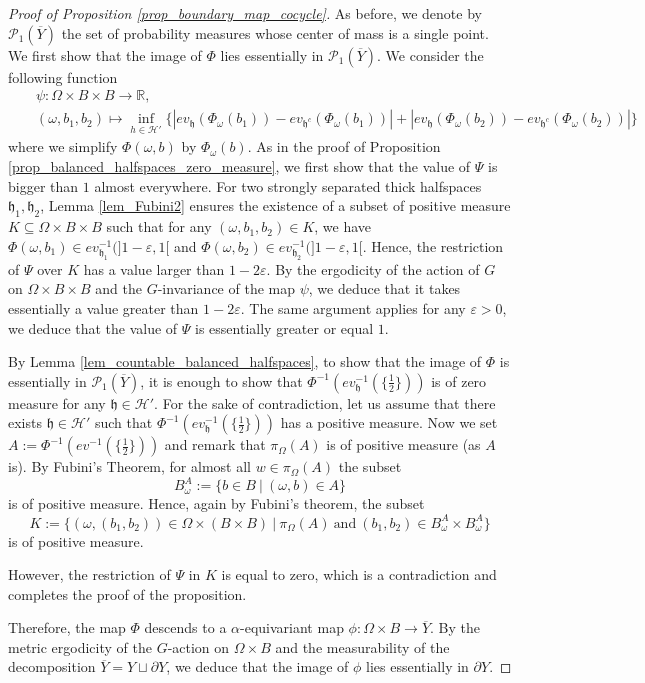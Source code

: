 \documentclass{amsart}
\numberwithin{equation}{section}
\newcommand{\HH}{\mathcal{H}}     %
\newcommand{\hh}{\mathfrak{h}}    %
\newcommand{\PP}{\mathcal{P}}     %
\newcommand{\RR}{\mathbb{R}}      %
\theoremstyle{definition}
\def\bar{\overline}
\begin{document}
\begin{proof}[Proof of Proposition \ref{prop_boundary_map_cocycle}]
    As before, we denote by $\PP_1(\bar{Y})$ the set of probability measures whose center of mass is a single point. We first show that the image of $\Phi$ lies essentially in $\PP_1(\bar Y)$.  We consider the following function 
    \begin{eqnarray*}
            &&\psi: \Omega\times B\times B \rightarrow \RR,\\
            &&(\omega,b_1,b_2) \mapsto \inf_{h\in\HH'}{\{|ev_\hh(\Phi_{\omega}(b_1))-ev_{\hh^c}(\Phi_{\omega}(b_1))|+|ev_\hh(\Phi_{\omega}(b_2))-ev_{\hh^c}(\Phi_{\omega}(b_2))|\}}
        \end{eqnarray*}
  where we simplify $\Phi(\omega,b)$ by $\Phi_{\omega}(b)$. As in the proof of Proposition \ref{prop_balanced_halfspaces_zero_measure}, we first show that the value of $\Psi$ is bigger than $1$ almost everywhere. For two strongly separated thick halfspaces $\hh_1,\hh_2$, Lemma \ref{lem_Fubini2} ensures the existence of a subset of positive measure $K\subseteq \Omega\times B\times B$ such that for any $(\omega,b_1,b_2)\in K$, we have $\Phi(\omega,b_1)\in ev_{\hh_1}^{-1}(]1-\varepsilon,1[$ and $\Phi(\omega,b_2)\in ev_{\hh_2}^{-1}(]1-\varepsilon,1[$. Hence, the restriction of $\Psi$ over $K$ has a value larger than $1-2\varepsilon$. By the ergodicity of the action of $G$ on $\Omega\times B\times B$ and the $G$-invariance of the map $\psi$, we deduce that it takes essentially a value greater than $1-2\varepsilon$. The same argument applies for any $\varepsilon>0$, we deduce that the value of $\Psi$ is essentially greater or equal $1$.\par 
  By Lemma \ref{lem_countable_balanced_halfspaces}, to show that the image of $\Phi$ is essentially in $\PP_1(\bar Y)$, it is enough to show that $\Phi^{-1}(ev_\hh^{-1}(\{\frac{1}{2}\})) $ is of zero measure for any $\hh\in\HH'$. For the sake of contradiction, let us assume that there exists $\hh\in\HH'$ such that $\Phi^{-1}(ev_\hh^{-1}(\{\frac{1}{2}\}))$ has a positive measure. Now we set $A:=\Phi^{-1}(ev^{-1}(\{\frac{1}{2}\}))$ and remark that $\pi_{\Omega}(A)$ is of positive measure (as $A$ is). By Fubini's Theorem, for almost all $w\in \pi_\Omega(A)$ the subset 
  \[
  B_\omega^A:=\{b\in B\ |\ (\omega,b)\in A\}
  \]
  is of positive measure. Hence, again by Fubini's theorem, the subset 
  \[
  K:=\{(\omega,(b_1,b_2))\in \Omega\times ( B\times B)\ |\ \pi_\Omega(A)\ \text{and} \ (b_1,b_2)\in B_\omega^A\times B_\omega^A  \}
  \]
  is of positive measure.\par 
  

  However, the restriction of $\Psi$ in $K$ is equal to zero, which is a contradiction and completes the proof of the proposition.\par 
  Therefore, the map $\Phi$ descends to a $\alpha$-equivariant map $\phi: \Omega\times B\rightarrow \bar Y$. By the metric ergodicity of the $G$-action on $\Omega\times B$ and the measurability of the decomposition $\bar Y=Y\sqcup \partial Y$, we deduce that the image of $\phi$ lies essentially in $\partial Y$.
\end{proof}
\end{document}
